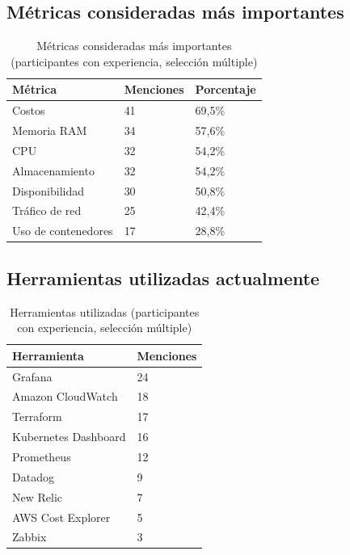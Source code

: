 \subsection{Métricas consideradas más importantes}

\begin{table}[H]
\centering
\scriptsize
\label{tab:enc-metricas}
\begin{tabular}{|p{6cm}|p{2cm}|p{3cm}|}
\hline
\textbf{Métrica} & \textbf{Menciones} & \textbf{Porcentaje} \\
\hline
Costos & 41 & 69,5\% \\
Memoria RAM & 34 & 57,6\% \\
CPU & 32 & 54,2\% \\
Almacenamiento & 32 & 54,2\% \\
Disponibilidad & 30 & 50,8\% \\
Tráfico de red & 25 & 42,4\% \\
Uso de contenedores & 17 & 28,8\% \\
\hline
\end{tabular}
\caption{Métricas consideradas más importantes (participantes con experiencia, selección múltiple)}
\end{table}

\subsection{Herramientas utilizadas actualmente}

\begin{table}[H]
\centering
\scriptsize
\label{tab:enc-herramientas}
\begin{tabular}{|p{6cm}|p{2cm}|}
\hline
\textbf{Herramienta} & \textbf{Menciones} \\
\hline
Grafana & 24 \\
Amazon CloudWatch & 18 \\
Terraform & 17 \\
Kubernetes Dashboard & 16 \\
Prometheus & 12 \\
Datadog & 9 \\
New Relic & 7 \\
AWS Cost Explorer & 5 \\
Zabbix & 3 \\
\hline
\end{tabular}
\caption{Herramientas utilizadas (participantes con experiencia, selección múltiple)}
\end{table}

